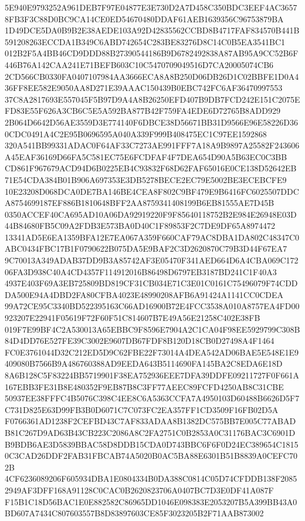 \documentclass[UTF8,fontset=fandol,zihao=-4,a4paper]{ctexart}
\begin{document}
{{5E940E9793252A961DEB7F97E04877E3E730D2A7D458C350BDC3EEF4AC36578FB3F3C88D0BC9CA14CE0ED54670480DDAF61AEB1639356C96753879BA
1D49DCE5DA0B9B2E38AEDE103A92D42835562CCBD8B4717FAF834570B441B591208263ECCDA1B349C6ABD742654C283BE83276D8C14C0B5EA3541BC1
012B2F5A4BB46CD9DDD88B27390544186B9D6782492838A87AB95A9CC52B6F446B76A142CAA241E71BEFB603C10C5470709049516D7CA20005074CB6
2CD566CB0330FA0407107984AA3666ECA8A8B250D06DB26D1C02BBFE1D0A436FF8EE582E9050AA8D271E39AAAC150439B0EBC742FC6AF36470997553
37C8A2817693E557045F5B97D9A4A8B26250EFD407B9DB7FCD242E151C2075EFD83E55F626A3CB6C5E5A592BA877B42F759FA4EDE6D72765B8ADD929
2B064D6642D56AE3559D3E774140F6DBCE38D56671BB31D9566E96E58226D360CDC0491A4C2E95B0696595A040A339F999B408475EC1C97EE1592868
320A541BB99331ADAC0F64AF33C7273AE991FFF7A18A9B9897A25582F243606A45EAF36169D66FA5C581EC75E6FCDFAF4F7DEA654D90A5B63EC0C3BB
CD861F967679ACD94D6B0225EB4C93832F68D62FAF65016E0CE138D52642EB71E54CDA384B01B906A697353E3DB5278BECE2EC79E5002BE3ECEBCFE9
10E23208D068DCA0DE7BA146BE4CEA8F802C9BF479E9B6416FC6025507DDCA8754699187EF886B1810648BFF2AA8759341408199B6EB81555AE7D45B
0350ACCEF40CA695AD10A06DA92919220F9F85640118752B2E984E26948E03D44B84680FB5C09A2FDB3E573BA0D40C1F89853F2C7DE9DF65A8974472
13341AD5E6EA1359BFA12E7EA067A359F660CAF79AC8DBA1DA802C48347C0ABC0434FBC17B1F0790622B075DA5E9BAF2C3D2620870C79B3D44F67EA7
9C70013A349ADAB37DD9B3A85742AF3E05470F341AED664D6A4CBA069C17206FA3D938C40A4CD4357F114912016B86498D6797EB3187BD241C1F40A3
4937E403F69A3EB725809BD819CF31CB034E71C3E01C0161C75496079F74CDDDA500E94A4DBD2FA80CFBA4023E48990208AFB6A91424A1141CC0CDEA
99A72CE95C3340BD522395163C66AD16900B72E4FCC3538A010A8757EA4FD00923207E22941F05619F72F60F51C814607B7E49A56E21258C402E38FB
019F7E99BF4C2A530013A65EBBC9F8596E7904A2C1CA04F98EE5929799C308B84D4DD76E527FE39C3002E9607DB67FDF8B120D18CB0D27498A4F1464
FC0E3761044D32C212ED5D9C62FBE22F73014A4DEA542AD06BAE5E548E1E9409080B7566B9A486760388AD9EEDA643B5114690FA145BA2C8EDA6E18D
8A6B128C5F83224BB5719901F38EA752936EEE7DFA39DDFE09211727F0F661A167EBB3FE31B8E480352F9EB87B8C3FF77AEEC89FCFD4250AB8C31CBE
50937EE38FFFC4B5076C398C4EE8C6A5363CCFA7A4950103D60488B6626D5F7C731D825E63D99FB3B0D6071C7C073FC2EA357FF1CD3509F16FB02D5A
F0766361AD1238F2CEFBD43C7AF833ADAA8B1382DC575BB7E005C77ABADB81C267D9AD63B43CB223C2086A8C2FA2751C0B2853A0C31176BAC3C6901D
B9BDB6AE3D5839BBAC58D8DDB15CDA0D743BBC6F6F0D24EC389654C18150C3CAD26DDF2FAB31FBCAB74A5020B0AC5BA88E6301B51B8839A0CEFC702B
4CF6236089206F605934DBA1E0804334B0DA388C0814C05D74CFDDB138F20852949AF3DFF168A91128C0CAC0B2620823706A0407BC7D3E0DF41A087F
F15B1C18D56BAC1E0E882582C86965DD1046E098383E2053207B5A399BB43A0BD607A7434C807603557B8D83897603CE85F3023205B2F71AAB873002
}}
\end{document}

